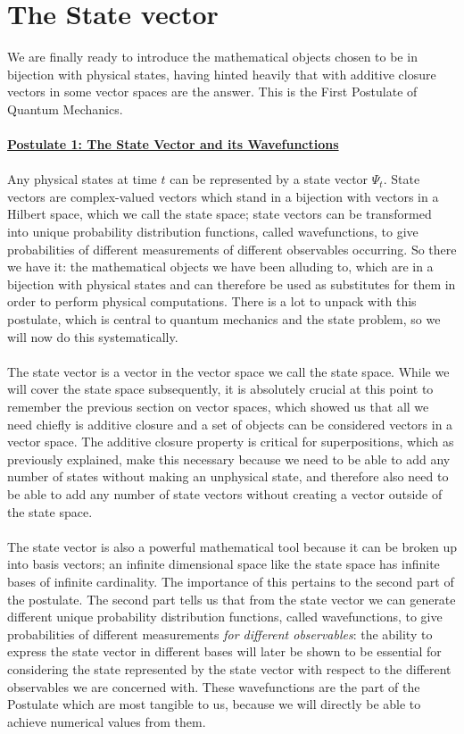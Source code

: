 \section{The State vector}
We are finally ready to introduce the mathematical objects chosen to be in bijection with physical states, having hinted heavily that with additive closure vectors in some vector spaces are the answer. This is the First Postulate of Quantum Mechanics.
\\\\
\Answer
\underline{\textbf{Postulate 1: The State Vector and its Wavefunctions}}\\\\
Any physical states at time $t$ can be represented by a state vector $\Psi_{t}$. State vectors are complex-valued vectors which stand in a bijection with vectors in a Hilbert space, which we call the state space; state vectors can be transformed into unique probability distribution functions, called wavefunctions, to give probabilities of different measurements of different observables occurring.
\Answerend
So there we have it: the mathematical objects we have been alluding to, which are in a bijection with physical states and can therefore be used as substitutes for them in order to perform physical computations. There is a lot to unpack with this postulate, which is central to quantum mechanics and the state problem, so we will now do this systematically.
\\\\
The state vector is a vector in the vector space we call the state space. While we will cover the state space subsequently, it is absolutely crucial at this point to remember the previous section on vector spaces, which showed us that all we need chiefly is additive closure and a set of objects can be considered vectors in a vector space. The additive closure property is critical for superpositions, which as previously explained, make this necessary because we need to be able to add any number of states without making an unphysical state, and therefore also need to be able to add any number of state vectors without creating a vector outside of the state space.
\\\\
The state vector is also a powerful mathematical tool because it can be broken up into basis vectors; an infinite dimensional space like the state space has infinite bases of infinite cardinality. The importance of this pertains to the second part of the postulate. The second part tells us that from the state vector we can generate different unique probability distribution functions, called wavefunctions, to give probabilities of different measurements \textit{for different observables}: the ability to express the state vector in different bases will later be shown to be essential for considering the state represented by the state vector with respect to the different observables we are concerned with. These wavefunctions are the part of the Postulate which are most tangible to us, because we will directly be able to achieve numerical values from them. 
